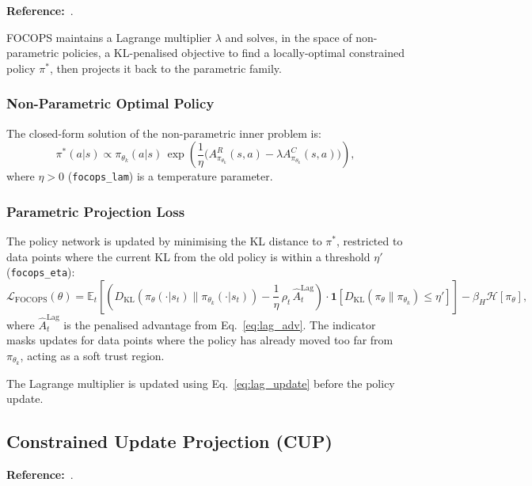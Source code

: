 \documentclass[12pt,a4paper]{article}
\theoremstyle{definition}
\newcommand{\E}{\mathbb{E}}
\newcommand{\piold}{\pi_{\theta_k}}
\newcommand{\KL}{D_{\mathrm{KL}}}
\newcommand{\lagm}{\lambda}
\begin{document}
\textbf{Reference:}~\citet{zhang2020first}.

FOCOPS maintains a Lagrange multiplier $\lagm$ and solves, in the space of non-parametric
policies, a KL-penalised objective to find a locally-optimal constrained policy $\pi^*$,
then projects it back to the parametric family.

\subsubsection{Non-Parametric Optimal Policy}

The closed-form solution of the non-parametric inner problem is:
\begin{equation}
  \pi^*(a|s) \propto \piold(a|s)\,\exp\!\left(\frac{1}{\eta}\bigl(A^R_{\piold}(s,a) - \lagm A^C_{\piold}(s,a)\bigr)\right),
\end{equation}
where $\eta > 0$ (\texttt{focops\_lam}) is a temperature parameter.

\subsubsection{Parametric Projection Loss}

The policy network is updated by minimising the KL distance to $\pi^*$, restricted to
data points where the current KL from the old policy is within a threshold $\eta'$
(\texttt{focops\_eta}):
\begin{equation}
  \label{eq:focops_loss}
  \mathcal{L}_{\mathrm{FOCOPS}}(\theta) = \E_t\!\left[
    \left(\KL(\pi_\theta(\cdot|s_t)\|\piold(\cdot|s_t)) - \frac{1}{\eta}\,\rho_t\,\hat{A}_t^{\mathrm{Lag}}\right)
    \cdot\mathbf{1}\!\left[\KL(\pi_\theta\|\piold) \leq \eta'\right]
  \right]
  - \beta_H\mathcal{H}[\pi_\theta],
\end{equation}
where $\hat{A}_t^{\mathrm{Lag}}$ is the penalised advantage from Eq.~\ref{eq:lag_adv}.
The indicator masks updates for data points where the policy has already moved too far
from $\piold$, acting as a soft trust region.

The Lagrange multiplier is updated using Eq.~\ref{eq:lag_update} before the policy update.

\subsection{Constrained Update Projection (CUP)}
\label{sec:cup}

\textbf{Reference:}~\citet{yang2022constrained}.
\end{document}

